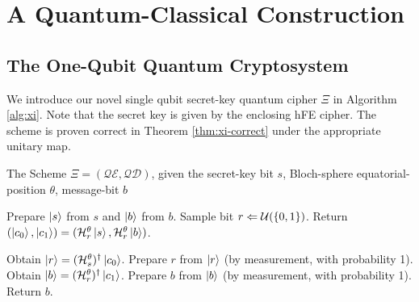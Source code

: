 \section{A Quantum-Classical Construction}
\label{sec:scheme}

\subsection{The One-Qubit Quantum Cryptosystem}
\label{sec:xi}
We introduce our novel single qubit secret-key quantum cipher $\Xi$ in Algorithm \ref{alg:xi}. Note that the secret key is given by the enclosing hFE cipher. The scheme is proven correct in Theorem \ref{thm:xi-correct} under the appropriate unitary map.

\begin{algorithm}[h]
\caption{The Scheme $\Xi = (\mathcal{QE},\mathcal{QD})$, given the secret-key bit $s$, Bloch-sphere equatorial-position $\theta$, message-bit $b$}
\label{alg:xi}
\begin{algorithmic}[1]

\State Prepare $\ket{s}$ from $s$ and $\ket{b}$ from $b$.
\State Sample bit $r \Leftarrow \mathcal{U}(\{0,1\})$.
\State Return $(\ket{c_0},\ket{c_1}) = (\mathcal{H}^\theta_r\ket{s},\mathcal{H}^\theta_r\ket{b})$.
\EndProcedure

\State Obtain $\ket{r} = (\mathcal{H}^\theta_s)^\dagger\ket{c_0}$.
\State Prepare $r$ from $\ket{r}$ (by measurement, with probability 1).
\State Obtain $\ket{b} = (\mathcal{H}^\theta_r)^\dagger\ket{c_1}$.
\State Prepare $b$ from $\ket{b}$ (by measurement, with probability 1).
\State Return $b$.
\EndProcedure

\end{algorithmic}
\end{algorithm}

